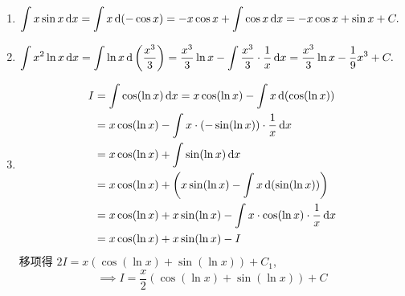 \begin{solution}
    \begin{enumerate}
        \item \begin{align*}
                  \int x \sin x \operatorname{d\!} x & = \int x \operatorname{d} (-\cos x) = -x \cos x + \int \cos x \operatorname{d\!} x = -x \cos x + \sin x + C.
              \end{align*}
        \item \begin{align*}
                  \int x^2 \ln x \operatorname{d\!} x & = \int \ln x \operatorname{d} \left( \frac{x^3}{3} \right) = \frac{x^3}{3} \ln x - \int \frac{x^3}{3} \cdot \frac{1}{x} \operatorname{d\!} x = \frac{x^3}{3} \ln x - \frac{1}{9} x^3 + C.
              \end{align*}

        \item %
              \begin{align*}
                  I & = \int \cos(\ln x) \operatorname{d\!} x = x \cos(\ln x) - \int x \operatorname{d}(\cos(\ln x))               \\
                    & = x \cos(\ln x) - \int x \cdot (-\sin(\ln x)) \cdot \frac{1}{x} \operatorname{d\!} x              \\
                    & = x \cos(\ln x) + \int \sin(\ln x) \operatorname{d\!} x                                           \\
                    & = x \cos(\ln x) + \left( x \sin(\ln x) - \int x \operatorname{d}(\sin(\ln x)) \right)          \\
                    & = x \cos(\ln x) + x \sin(\ln x) - \int x \cdot \cos(\ln x) \cdot \frac{1}{x} \operatorname{d\!} x \\
                    & = x \cos(\ln x) + x \sin(\ln x) - I
              \end{align*}
              移项得 $2I = x(\cos(\ln x) + \sin(\ln x)) + C_1$,
              $$ \implies I = \frac{x}{2}(\cos(\ln x) + \sin(\ln x)) + C $$


\end{enumerate}
\end{solution}
